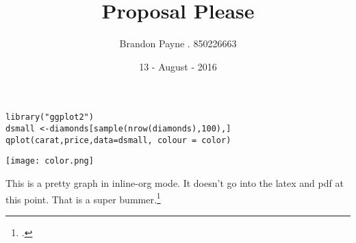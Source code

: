 \documentclass[koma, a4paper, utopia, 12pt]{article}
\author{Brandon Payne . 850226663\\
}
\date{13 - August - 2016}
\title{Proposal Please}\\\medskip
\begin{document}
\maketitle
\begin{verbatim}
library("ggplot2")
dsmall <-diamonds[sample(nrow(diamonds),100),]
qplot(carat,price,data=dsmall, colour = color)
\end{verbatim}

\texttt{[image: color.png]}

This is a pretty graph in inline-org mode.  It doesn't go into the latex and pdf at this point.
That is a super bummer.\footcite[][23-25]{ganzeboom1993}
\end{document}
